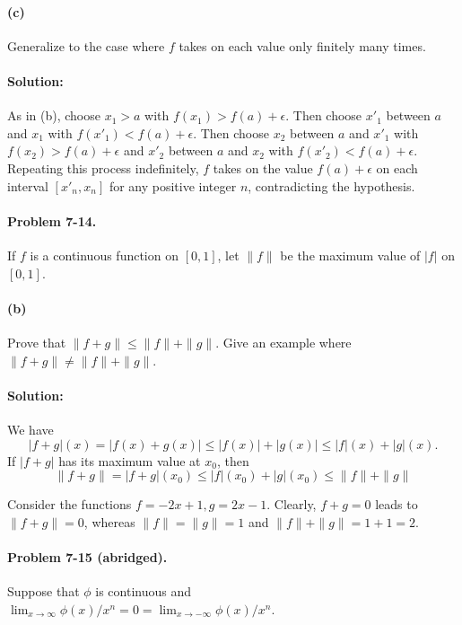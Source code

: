 \documentclass{article}
\begin{document}
\paragraph{(c)} Generalize to the case where $f$ takes on each value only
finitely many times.

\paragraph{Solution:} As in (b), choose $x_1 > a$ with $f(x_1) > f(a) +
\epsilon$. Then choose $x'_1$ between $a$ and $x_1$ with $f(x'_1) < f(a) +
\epsilon$. Then choose $x_2$ between $a$ and $x'_1$ with $f(x_2) > f(a) +
\epsilon$ and $x'_2$ between $a$ and $x_2$ with $f(x'_2) < f(a) + \epsilon$.
Repeating this process indefinitely, $f$ takes on the value $f(a) + \epsilon$
on each interval $[x'_n, x_n]$ for any positive integer $n$, contradicting the
hypothesis.

\paragraph{Problem 7-14.} If $f$ is a continuous function on $[0, 1]$, let
$\|f\|$ be the maximum value of $|f|$ on $[0, 1]$.

\paragraph{(b)} Prove that $\|f + g\| \leq \|f\| + \|g\|$. Give an example
where $\|f + g\| \neq \|f\| + \|g\|$.

\paragraph{Solution:} We have \begin{equation*}
  |f + g|(x) = |f(x) + g(x)| \leq |f(x)| + |g(x)| \leq |f|(x) + |g|(x).
\end{equation*}
If $|f + g|$ has its maximum value at $x_0$, then \begin{equation*}
  \|f + g\| = |f + g|(x_0) \leq |f|(x_0) + |g|(x_0) \leq \|f\| + \|g\|
\end{equation*}

Consider the functions $f = -2x + 1, g = 2x - 1$. Clearly, $f + g = 0$ leads to
$\|f + g\| = 0$, whereas $\|f\| = \|g\| = 1$ and $\|f\| + \|g\| = 1 + 1 = 2$.

\paragraph{Problem 7-15 (abridged).} Suppose that $\phi$ is continuous and
$\lim_{x \rightarrow \infty}\phi(x)/x^n = 0 = \lim_{x \rightarrow -\infty}
\phi(x)/x^n$.
\end{document}
